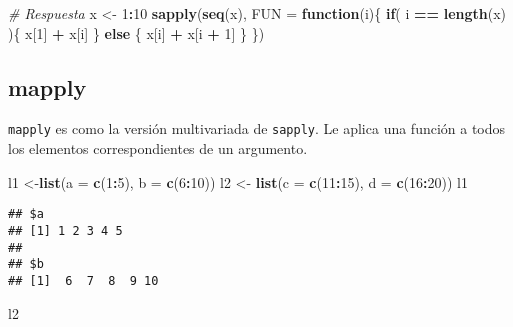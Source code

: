 \documentclass[]{article}
\newenvironment{Shaded}{\begin{snugshade}}{\end{snugshade}}
\newcommand{\KeywordTok}[1]{\textcolor[rgb]{0.13,0.29,0.53}{\textbf{#1}}}
\newcommand{\DataTypeTok}[1]{\textcolor[rgb]{0.13,0.29,0.53}{#1}}
\newcommand{\DecValTok}[1]{\textcolor[rgb]{0.00,0.00,0.81}{#1}}
\newcommand{\StringTok}[1]{\textcolor[rgb]{0.31,0.60,0.02}{#1}}
\newcommand{\CommentTok}[1]{\textcolor[rgb]{0.56,0.35,0.01}{\textit{#1}}}
\newcommand{\ControlFlowTok}[1]{\textcolor[rgb]{0.13,0.29,0.53}{\textbf{#1}}}
\newcommand{\OperatorTok}[1]{\textcolor[rgb]{0.81,0.36,0.00}{\textbf{#1}}}
\newcommand{\NormalTok}[1]{#1}
\begin{document}
\begin{Shaded}
\begin{Highlighting}[]
\CommentTok{# Respuesta}
\NormalTok{x <-}\StringTok{ }\DecValTok{1}\OperatorTok{:}\DecValTok{10}
\KeywordTok{sapply}\NormalTok{(}\KeywordTok{seq}\NormalTok{(x), }\DataTypeTok{FUN =} \ControlFlowTok{function}\NormalTok{(i)\{}
  \ControlFlowTok{if}\NormalTok{( i }\OperatorTok{==}\StringTok{ }\KeywordTok{length}\NormalTok{(x) )\{}
\NormalTok{    x[}\DecValTok{1}\NormalTok{] }\OperatorTok{+}\StringTok{ }\NormalTok{x[i]}
\NormalTok{  \} }\ControlFlowTok{else}\NormalTok{ \{}
\NormalTok{    x[i] }\OperatorTok{+}\StringTok{ }\NormalTok{x[i }\OperatorTok{+}\StringTok{ }\DecValTok{1}\NormalTok{]}
\NormalTok{  \}}
\NormalTok{\})}
\end{Highlighting}
\end{Shaded}

\subsection{mapply}\label{mapply}

\texttt{mapply} es como la versión multivariada de \texttt{sapply}. Le
aplica una función a todos los elementos correspondientes de un
argumento.

\begin{Shaded}
\begin{Highlighting}[]
\NormalTok{l1 <-}\KeywordTok{list}\NormalTok{(}\DataTypeTok{a =} \KeywordTok{c}\NormalTok{(}\DecValTok{1}\OperatorTok{:}\DecValTok{5}\NormalTok{), }\DataTypeTok{b =} \KeywordTok{c}\NormalTok{(}\DecValTok{6}\OperatorTok{:}\DecValTok{10}\NormalTok{))}
\NormalTok{l2 <-}\StringTok{ }\KeywordTok{list}\NormalTok{(}\DataTypeTok{c =} \KeywordTok{c}\NormalTok{(}\DecValTok{11}\OperatorTok{:}\DecValTok{15}\NormalTok{), }\DataTypeTok{d =} \KeywordTok{c}\NormalTok{(}\DecValTok{16}\OperatorTok{:}\DecValTok{20}\NormalTok{))}
\NormalTok{l1}
\end{Highlighting}
\end{Shaded}

\begin{verbatim}
## $a
## [1] 1 2 3 4 5
## 
## $b
## [1]  6  7  8  9 10
\end{verbatim}

\begin{Shaded}
\begin{Highlighting}[]
\NormalTok{l2}
\end{Highlighting}
\end{Shaded}
\end{document}
